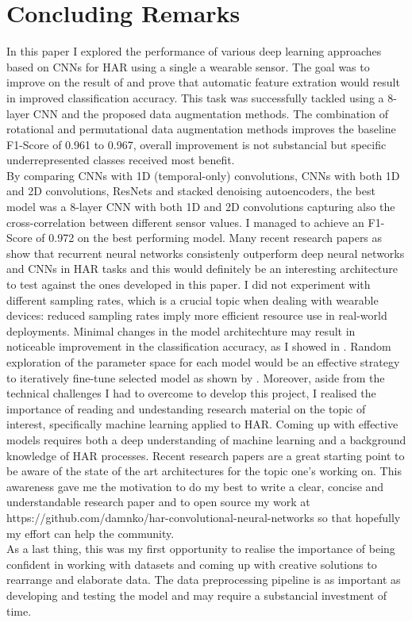
\section{Concluding Remarks}
\label{sec:conclusions}
In this paper I explored the performance of various deep learning approaches based on CNNs for HAR using a single a wearable sensor. The goal was to improve on the result of \cite{base-paper} and prove that automatic feature extration would result in improved classification accuracy. This task was successfully tackled using a 8-layer CNN and the proposed data augmentation methods. The combination of rotational and permutational data augmentation methods improves the baseline \mbox{F1-Score} of 0.961 to 0.967, overall improvement is not substancial but specific underrepresented classes received most benefit.\\
By comparing CNNs with 1D (temporal-only) convolutions, CNNs with both 1D and 2D convolutions, ResNets and stacked denoising autoencoders, the best model was a 8-layer CNN with both 1D and 2D convolutions capturing also the cross-correlation between different sensor values. I managed to achieve an \mbox{F1-Score} of 0.972 on the best performing model.
Many recent research papers as \cite{nils-2016, Valarezo-2017, su-2016} show that recurrent neural networks consistenly outperform deep neural networks and CNNs in HAR tasks and this would definitely be an interesting architecture to test against the ones developed in this paper. I did not experiment with different sampling rates, which is a crucial topic when dealing with wearable devices: reduced sampling rates imply more efficient resource use in \mbox{real-world} deployments. Minimal changes in the model architechture may result in noticeable improvement in the classification accuracy, as I showed in . Random exploration of the parameter space for each model would be an effective strategy to iteratively \mbox{fine-tune} selected model as shown by \cite{nils-2016}.
Moreover, aside from the technical challenges I had to overcome to develop this project, I realised the importance of reading and undestanding research material on the topic of interest, specifically machine learning applied to HAR. Coming up with effective models requires both a deep understanding of machine learning and a background knowledge of HAR processes. Recent research papers are a great starting point to be aware of the state of the art architectures for the topic one's working on. This awareness gave me the motivation to do my best to write a clear, concise and understandable research paper and to open source my work at https://github.com/damnko/har-convolutional-neural-networks so that hopefully my effort can help the community.\\
As a last thing, this was my first opportunity to realise the importance of being confident in working with datasets and coming up with creative solutions to rearrange and elaborate data. The data preprocessing pipeline is as important as developing and testing the model and may require a substancial investment of time.
